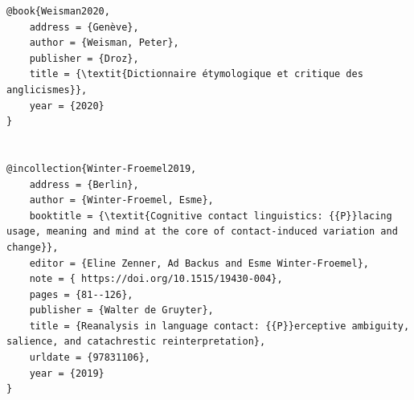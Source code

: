 \documentclass[output=paper]{langscibook}
\begin{document}
\begin{verbatim}
@book{Weisman2020,
	address = {Genève},
	author = {Weisman, Peter},
	publisher = {Droz},
	title = {\textit{Dictionnaire étymologique et critique des anglicismes}},
	year = {2020}
}


@incollection{Winter-Froemel2019,
	address = {Berlin},
	author = {Winter-Froemel, Esme},
	booktitle = {\textit{Cognitive contact linguistics: {{P}}lacing usage, meaning and mind at the core of contact-induced variation and change}},
	editor = {Eline Zenner, Ad Backus and Esme Winter-Froemel},
	note = { https://doi.org/10.1515/19430-004},
	pages = {81--126},
	publisher = {Walter de Gruyter},
	title = {Reanalysis in language contact: {{P}}erceptive ambiguity, salience, and catachrestic reinterpretation},
	urldate = {97831106},
	year = {2019}
}


\end{verbatim}
\sloppy\printbibliography[heading=subbibliography,notkeyword=this]
\end{document}
